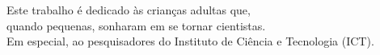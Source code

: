 Este trabalho é dedicado às crianças adultas que,\\
quando pequenas, sonharam em se tornar cientistas. \\
Em especial, ao pesquisadores do Instituto de Ciência e Tecnologia (ICT).
